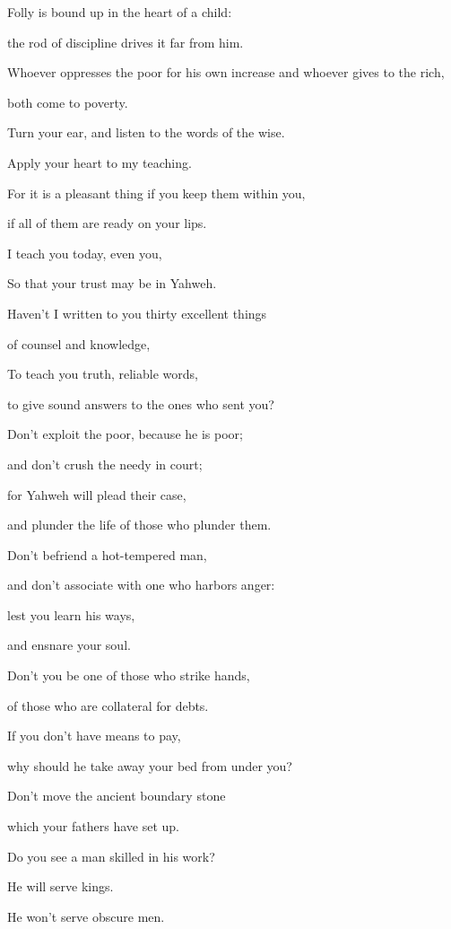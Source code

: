{\par }{\Q {}Folly is bound up in the heart of a child:
\par }{\QB the rod of discipline drives it far from him.
\par }{\Q {}Whoever oppresses the poor for his own increase and whoever gives to the rich,
\par }{\QB both come to poverty.
\par }{\BB \par }{\Q {}Turn your ear, and listen to the words of the wise.
\par }{\QB Apply your heart to my teaching.
\par }{\Q {}For it is a pleasant thing if you keep them within you,
\par }{\QB if all of them are ready on your lips.
\par }{\Q {}I teach you today, even you,
\par }{\QB So that your trust may be in Yahweh.
\par }{\Q {}Haven’t I written to you thirty excellent things
\par }{\QB of counsel and knowledge,
\par }{\Q {}To teach you truth, reliable words,
\par }{\QB to give sound answers to the ones who sent you?
\par }{\BB \par }{\Q {}Don’t exploit the poor, because he is poor;
\par }{\QB and don’t crush the needy in court;
\par }{\Q {}for Yahweh will plead their case,
\par }{\QB and plunder the life of those who plunder them.
\par }{\BB \par }{\Q {}Don’t befriend a hot-tempered man,
\par }{\QB and don’t associate with one who harbors anger:
\par }{\Q {}lest you learn his ways,
\par }{\QB and ensnare your soul.
\par }{\BB \par }{\Q {}Don’t you be one of those who strike hands,
\par }{\QB of those who are collateral for debts.
\par }{\Q {}If you don’t have means to pay,
\par }{\QB why should he take away your bed from under you?
\par }{\BB \par }{\Q {}Don’t move the ancient boundary stone
\par }{\QB which your fathers have set up.
\par }{\BB \par }{\Q {}Do you see a man skilled in his work?
\par }{\QB He will serve kings.
\par }{\QB He won’t serve obscure men.
\par }{\BB \par }

